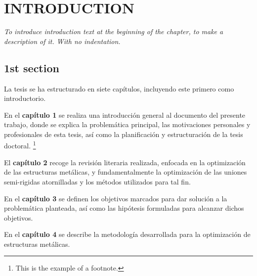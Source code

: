 \setcounter{page}{1}

\chapter{INTRODUCTION} %
\label{Introduction} %


\vspace*{3\baselineskip} %

\noindent \textit{To introduce introduction text at the beginning of the chapter, to make a description of it. With no indentation.}

\section{1st section}

La tesis se ha estructurado en siete capítulos, incluyendo este primero como introductorio.

En el \textbf{capítulo 1} se realiza una introducción general al documento del presente trabajo, donde se explica la problemática principal, las motivaciones personales y profesionales de esta tesis, así como la planificación y estructuración de la tesis doctoral. \footnote{This is the example of a footnote.}

El \textbf{capítulo 2}  recoge la revisión literaria realizada, enfocada en la optimización de las estructuras metálicas, y fundamentalmente la optimización de las uniones semi-rigidas atornilladas y los métodos utilizados para tal fin. \cite{Chander1983AbnormalStudy}

En el \textbf{capítulo 3} se definen los objetivos marcados para dar solución a la problemática planteada, así como las hipótesis formuladas para alcanzar dichos objetivos. 

En el \textbf{capítulo 4} se describe la metodología desarrollada para la optimización de estructuras metálicas.
\blindtext

